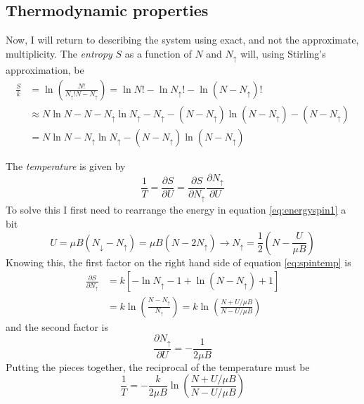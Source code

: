 \documentclass[10pt,a4paper]{amsart}
\begin{document}
\subsection{Thermodynamic properties}

Now, I will return to describing the system using exact, and not the approximate, multiplicity. The \emph{entropy} $S$ as a function of $N$ and $N_{\uparrow}$ will, using Stirling's approximation, be
\begin{align}
\frac{S}{k} &= \ln \left(\frac{N!}{N_{\uparrow}!N-N_{\uparrow}} \right) = \ln N! - \ln N_{\uparrow}! - \ln (N-N_{\uparrow})! \\
 & \approx N \ln N - N - N_{\uparrow}\ln N_{\uparrow}-N_{\uparrow} -(N-N_{\uparrow}) \ln (N-N_{\uparrow}) - (N- N_{\uparrow}) \\
 &= N \ln N - N_{\uparrow}\ln N_{\uparrow} - (N-N_{\uparrow}) \ln (N-N_{\uparrow}) 
\end{align}

The \emph{temperature} is given by
\begin{equation}
\label{eq:spintemp}
\frac{1}{T} = \frac{\partial S}{\partial U} = \frac{\partial S}{\partial N_{\uparrow}}\frac{\partial N_{\uparrow}}{\partial U}
\end{equation}
To solve this I first need to rearrange the energy in equation \ref{eq:energyspin1} a bit
\begin{equation}
U = \mu B(N_{\downarrow} -N_{\uparrow}) = \mu B (N-2N_{\uparrow})
\rightarrow N_{\uparrow} = \frac{1}{2}\left(N -\frac{U}{\mu B} \right)
\end{equation} 
Knowing this, the first factor on the right hand side of equation \ref{eq:spintemp} is
\begin{align}
\frac{\partial S}{\partial N_{\uparrow}} &= k[-\ln N_{\uparrow}-1 +\ln (N-N_{\uparrow}) +1] \\
&= k \ln \left(\frac{N-N_{\uparrow}}{N_{\uparrow}} \right) = k \ln \left( \frac{N+U/\mu B}{N-U/\mu B} \right)
\end{align}
and the second factor is
\begin{equation}
\frac{\partial N_{\uparrow}}{\partial U} = -\frac{1}{2 \mu B} 
\end{equation}
Putting the pieces together, the reciprocal of the temperature must be
\begin{equation}
\frac{1}{T} = -\frac{k}{2\mu B}\ln \left(\frac{N+U/\mu B}{N-U/\mu B} \right)
\end{equation}
\end{document}
